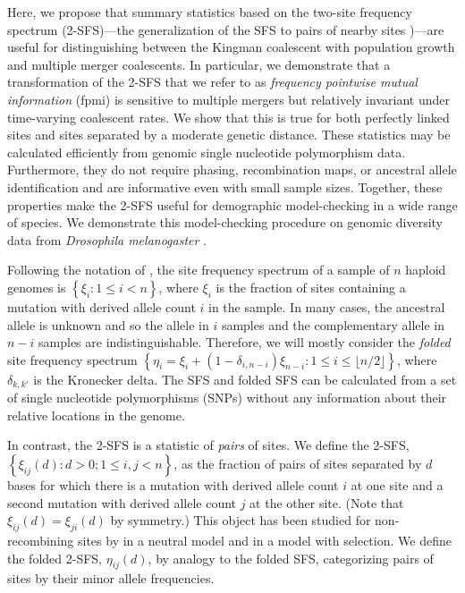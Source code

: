 \documentclass[11pt, letterpaper]{article}   	%
\newcommand{\floor}[1]{\lfloor #1 \rfloor}
\begin{document}
Here, we propose that summary statistics based on the two-site frequency spectrum (2-SFS)---the generalization of the SFS to pairs of nearby sites \autocite{Hudson2001, FerrettiEtal2018})---are useful for distinguishing between the Kingman coalescent with population growth and multiple merger coalescents.
In particular, we demonstrate that a transformation of the 2-SFS that we refer to as \emph{frequency pointwise mutual information} (fpmi) is sensitive to multiple mergers but relatively invariant under time-varying coalescent rates.
We show that this is true for both perfectly linked sites and sites separated by a moderate genetic distance.
These statistics may be calculated efficiently from genomic single nucleotide polymorphism data.
Furthermore, they do not require phasing, recombination maps, or ancestral allele identification and are informative even with small sample sizes.
Together, these properties make the 2-SFS useful for demographic model-checking in a wide range of species.
We demonstrate this model-checking procedure on genomic diversity data from \textit{Drosophila melanogaster} \autocite{LackEtAl2015}.

Following the notation of \cite{Fu1995}, the site frequency spectrum of a sample of $n$ haploid genomes is $\left\{ \xi_i : 1 \leq i < n \right\}$, where $\xi_i$ is the fraction of sites containing a mutation with derived allele count $i$ in the sample.
In many cases, the ancestral allele is unknown and so the allele in $i$ samples and the complementary allele in $n-i$ samples are indistinguishable.
Therefore, we will mostly consider the \textit{folded} site frequency spectrum $\left\{ \eta_i = \xi_i + (1-\delta_{i,n-i}) \xi_{n-i}: 1 \leq i \leq \floor{n/2} \right\}$, where $\delta_{k,k'}$ is the Kronecker delta. %
The SFS and folded SFS can be calculated from a set of single nucleotide polymorphisms (SNPs) without any information about their relative locations in the genome.

In contrast, the 2-SFS is a statistic of \textit{pairs} of sites.
We define the 2-SFS,
$\left\{ \xi_{ij}(d) : d > 0; 1 \leq i, j < n\right\}$,
as the fraction of pairs of sites separated by $d$ bases for which there is a mutation with derived allele count $i$ at one site and a second mutation with derived allele count $j$ at the other site.
(Note that $\xi_{ij}(d) = \xi_{ji}(d)$ by symmetry.)
This object has been studied for non-recombining sites by \cite{FerrettiEtAl2018} in a neutral model and \cite{Xie2011} in a model with selection.
We define the folded 2-SFS, $\eta_{ij}(d)$, by analogy to the folded SFS,  categorizing pairs of sites by their minor allele frequencies.
\end{document}
